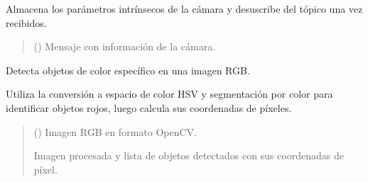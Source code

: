\documentclass[a4paper,10pt,spanish]{sphinxmanual}
\begin{document}
\begin{fulllineitems}
\begin{fulllineitems}
\sphinxAtStartPar
Almacena los parámetros intrínsecos de la cámara y desuscribe del tópico una vez recibidos.
\begin{quote}\begin{description}
\sphinxAtStartPar
{} () \textendash{} Mensaje con información de la cámara.

\end{description}\end{quote}

\end{fulllineitems}


\begin{fulllineitems}
\label{\detokenize{squad_object_detection_action:squad_object_detection_action.TurtleBotObjectDetectionAction.detect_objects}}
\pysigstartsignatures
{}
\pysigstopsignatures
\sphinxAtStartPar
Detecta objetos de color específico en una imagen RGB.

\sphinxAtStartPar
Utiliza la conversión a espacio de color HSV y segmentación por color para identificar objetos
rojos, luego calcula sus coordenadas de píxeles.
\begin{quote}\begin{description}
\sphinxAtStartPar
{} () \textendash{} Imagen RGB en formato OpenCV.

\sphinxAtStartPar
Imagen procesada y lista de objetos detectados con sus coordenadas de píxel.

\sphinxAtStartPar
{}

\end{description}\end{quote}

\end{fulllineitems}



\end{fulllineitems}
\end{document}
